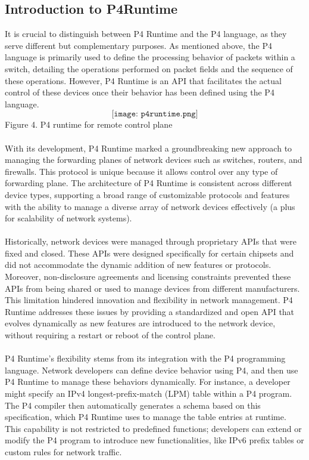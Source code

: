 \subsection{Introduction to P4Runtime}
It is crucial to distinguish between P4 Runtime and the P4 language, as they serve different but complementary purposes. As mentioned above, the P4 language is primarily used to define the processing behavior of packets within a switch, detailing the operations performed on packet fields and the sequence of these operations. However, P4 Runtime is an API that facilitates the actual control of these devices once their behavior has been defined using the P4 language. \\
$$
\texttt{[image: p4runtime.png]}
$$
Figure 4. P4 runtime for remote control plane\\ 
\\
With its development, P4 Runtime marked a groundbreaking new approach to managing the forwarding planes of network devices such as switches, routers, and firewalls. This protocol is unique because it allows control over any type of forwarding plane. The architecture of P4 Runtime is consistent across different device types, supporting a broad range of customizable protocols and features with the ability to manage a diverse array of network devices effectively (a plus for scalability of network systems). \\
\\
Historically, network devices were managed through proprietary APIs that were fixed and closed. These APIs were designed specifically for certain chipsets and did not accommodate the dynamic addition of new features or protocols. Moreover, non-disclosure agreements and licensing constraints prevented these APIs from being shared or used to manage devices from different manufacturers. This limitation hindered innovation and flexibility in network management. P4 Runtime addresses these issues by providing a standardized and open API that evolves dynamically as new features are introduced to the network device, without requiring a restart or reboot of the control plane.\\
\\
P4 Runtime's flexibility stems from its integration with the P4 programming language. Network developers can define device behavior using P4, and then use P4 Runtime to manage these behaviors dynamically. For instance, a developer might specify an IPv4 longest-prefix-match (LPM) table within a P4 program. The P4 compiler then automatically generates a schema based on this specification, which P4 Runtime uses to manage the table entries at runtime. This capability is not restricted to predefined functions; developers can extend or modify the P4 program to introduce new functionalities, like IPv6 prefix tables or custom rules for network traffic.

